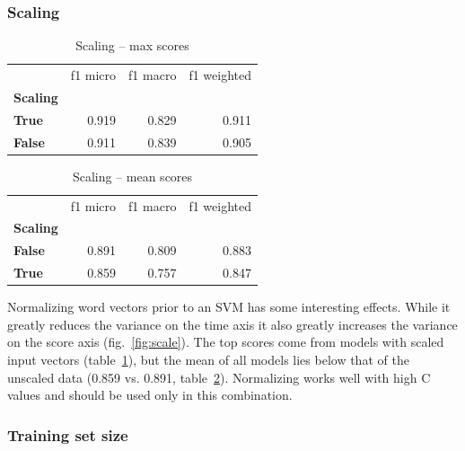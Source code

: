 \documentclass[11pt,a4paper]{article}
\begin{document}
\subsubsection{Scaling}


\begin{table}[htbp]
	\caption{Scaling -- max scores}
	\label{tab:scale_max}
	\centering
	\begin{tabular}{lrrr}
	\toprule
		{} &  f1 micro &  f1 macro &  f1 weighted \\
		\textbf{Scaling} &           &           & \\
		\midrule
		\textbf{True } & 0.919   & 0.829  &    0.911  \\
		\textbf{False} & 0.911   & 0.839  &    0.905  \\
		\bottomrule
	\end{tabular}
\end{table}


\begin{table}[htbp]
	\caption{Scaling -- mean scores}
	\label{tab:scale_mean}
	\centering
	\begin{tabular}{lrrr}
	\toprule
		{} &  f1 micro &  f1 macro &  f1 weighted \\
		\textbf{Scaling} &           &           & \\
		\midrule
		\textbf{False} &  0.891 &  0.809 &     0.883 \\
		\textbf{True } &  0.859 &  0.757 &     0.847 \\
		\bottomrule
	\end{tabular}
\end{table}


Normalizing word vectors prior to an SVM has some interesting effects. While it greatly reduces the variance on the time axis it also greatly increases the variance on the score axis (fig.~\ref{fig:scale}). The top scores come from models with scaled input vectors (table~\ref{tab:scale_max}), but the mean of all models lies below that of the unscaled data (0.859 vs. 0.891, table~\ref{tab:scale_mean}). Normalizing works well with high C values and should be used only in this combination.



\subsubsection{Training set size}
%
%
\end{document}
